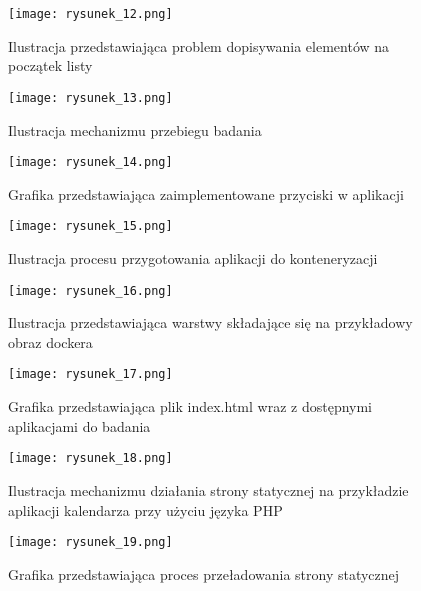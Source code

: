 \begin{figure}[!ht]
    \centering
    \texttt{[image: rysunek\_12.png]}
    \caption{Ilustracja przedstawiająca problem dopisywania elementów na początek listy}
    \label{fig:rysunek_12}
\end{figure}

\begin{figure}[!ht]
    \centering
    \texttt{[image: rysunek\_13.png]}
    \caption{Ilustracja mechanizmu przebiegu badania}
    \label{fig:rysunek_13}
\end{figure}

\begin{figure}[!ht]
    \centering
    \texttt{[image: rysunek\_14.png]}
    \caption{Grafika przedstawiająca zaimplementowane przyciski w aplikacji}
    \label{fig:rysunek_14}
\end{figure}

\begin{figure}[!ht]
    \centering
    \texttt{[image: rysunek\_15.png]}
    \caption{Ilustracja procesu przygotowania aplikacji do konteneryzacji}
    \label{fig:rysunek_15}
\end{figure}

\begin{figure}[!ht]
    \centering
    \texttt{[image: rysunek\_16.png]}
    \caption{Ilustracja przedstawiająca warstwy składające się na  przykładowy obraz dockera}
    \label{fig:rysunek_16}
\end{figure}

\begin{figure}[!ht]
    \centering
    \texttt{[image: rysunek\_17.png]}
    \caption{Grafika przedstawiająca plik index.html wraz z dostępnymi aplikacjami do badania}
    \label{fig:rysunek_17}
\end{figure}

\begin{figure}[!ht]
    \centering
    \texttt{[image: rysunek\_18.png]}
    \caption{Ilustracja mechanizmu działania strony statycznej na przykładzie aplikacji kalendarza przy użyciu języka PHP}
    \label{fig:rysunek_18}
\end{figure}

\begin{figure}[!ht]
    \centering
    \texttt{[image: rysunek\_19.png]}
    \caption{Grafika przedstawiająca proces przeładowania strony statycznej}
    \label{fig:rysunek_19}
\end{figure}

